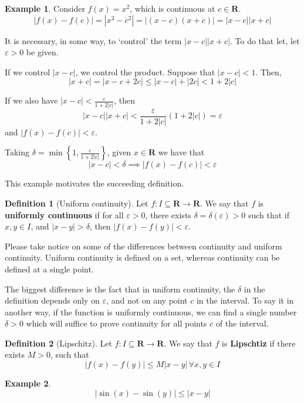 \documentclass[tikz,12pt,a4paper]{article}
\theoremstyle{definition}
\newtheorem{example}{Example}[section]
\newtheorem{definition}{Definition}[section]
\begin{document}
\begin{example}
	Consider $f(x) = x^2$, which is continuous at $c \in \textbf{R}$. 
	\[
		| f(x) - f(c) | = |x^2 - c^2| = |(x-c)(x+c)| = |x-c| |x+c|
	\]
	
	It is necessary, in some way, to `control' the term $|x-c| |x+c|$. To do that let, let $\varepsilon > 0$ be given.
	
	If we control $|x-c|$, we control the product. Suppose that $|x-c| < 1$. Then,
	\[
		|x+c| = |x-c + 2c| \leq |x-c| + |2c| < 1 + 2|c|
	\]
	
	If we also have $| x- c | < \frac{\varepsilon}{1 + 2 |c|}$, then
	\[
		|x-c| |x+c| < \frac{\varepsilon}{1+2|c|} (1+2|c|) = \varepsilon
	\]
	and $|f(x) - f(c)| < \varepsilon$.
	
	Taking $\delta = \min \left\{ 1, \frac{\varepsilon}{1+2|c|} \right\}$, given $x \in \textbf{R}$ we have that 
	\[
		|x-c| < \delta \implies |f(x) - f(c)| < \varepsilon
	\]
\end{example}

This example motivates the succeeding definition.

\begin{definition}[Uniform continuity]
	Let $f : I \subseteq \textbf{R} \longrightarrow \textbf{R}$. We say that $f$ is \textbf{uniformly continuous} if for all $\varepsilon > 0$, there exists $\delta = \delta(\varepsilon) > 0$ such that if $x, y \in I$, and $|x-y| > \delta$, then $|f(x) - f(y)| < \varepsilon$.
\end{definition}

Please take notice on some of the differences between continuity and uniform continuity. Uniform continuity is defined on a set, whereas continuity can be defined at a single point.

The biggest difference is the fact that in uniform continuity, the $\delta$ in the definition depends only on $\varepsilon$, and not on any point $c$ in the interval. To say it in another way, if the function is uniformly continuous, we can find a single number $\delta > 0$ which will suffice to prove continuity for all points $c$ of the interval.

\begin{definition}[Lipschitz]
	Let $f : I \subseteq \textbf{R} \longrightarrow \textbf{R}$. We say that $f$ is \textbf{Lipschtiz} if there exists $M > 0$, such that 
	\[
		|f(x) - f(y) | \leq M |x-y| \, \forall x,y \in I
	\]
\end{definition}

\begin{example}
	\[
		| \sin(x) - \sin(y) | \leq |x-y|
	\]
\end{example}
\end{document}
